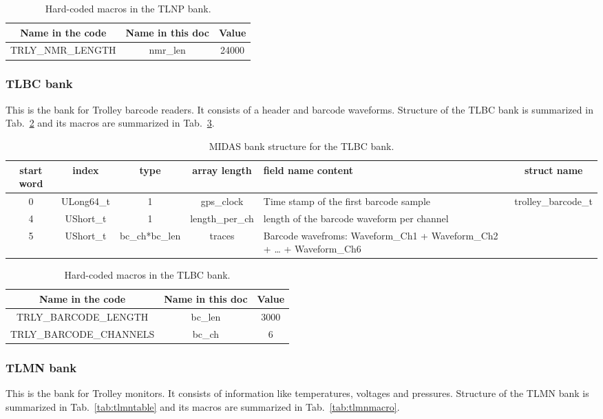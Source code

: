\begin{table}[htbp]
\centering
\caption{Hard-coded macros in the TLNP bank.}
\begin{tabular}{|c|c|c|}
\hline
Name in the code	& Name in this doc & Value \\
\hline
TRLY\_NMR\_LENGTH	 & nmr\_len & 24000 \\
\hline
\end{tabular} 
\label{tab:tlnpmacro}
\end{table}


\subsubsection*{TLBC bank}
This is the bank for Trolley barcode readers. It consists of a header and barcode waveforms.
Structure of the TLBC bank is summarized in Tab.~\ref{tab:tlbctable} and its macros are summarized in Tab.~\ref{tab:tlbcmacro}.

\begin{table}[htbp]
\centering
\caption{MIDAS bank structure for the TLBC bank.}
\begin{tabular}{|c|c|c|c|p{4cm}|c|}
\hline
start word & index & type & array length & field name	content & struct name \\ 
\hline
0 & ULong64\_t & 1 & gps\_clock & Time stamp of the first barcode sample & \multirow{3}{*}{trolley\_barcode\_t} \\
\cline{1-5}
4 & UShort\_t & 1 & length\_per\_ch & length of the barcode waveform per channel & \\ 
\cline{1-5}	
5 & UShort\_t	& bc\_ch*bc\_len & traces &	Barcode wavefroms: Waveform\_Ch1 + Waveform\_Ch2 + … + Waveform\_Ch6	 &\\
\hline
\end{tabular} 
\label{tab:tlbctable}
\end{table}


\begin{table}[htbp]
\centering
\caption{Hard-coded macros in the TLBC bank.}
\begin{tabular}{|c|c|c|}
\hline
Name in the code	& Name in this doc & Value \\
\hline
TRLY\_BARCODE\_LENGTH	& bc\_len & 3000 \\
\hline
TRLY\_BARCODE\_CHANNELS & bc\_ch & 6 \\
\hline
\end{tabular} 
\label{tab:tlbcmacro}
\end{table}

\subsubsection*{TLMN bank}
This is the bank for Trolley monitors. It consists of information like temperatures, voltages and pressures. Structure of the TLMN bank is summarized in Tab.~\ref{tab:tlmntable} and its macros are summarized in Tab.~\ref{tab:tlmnmacro}.

